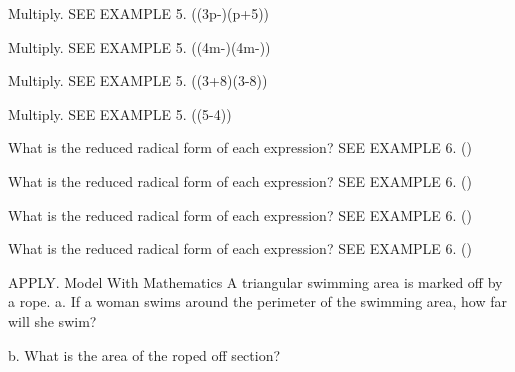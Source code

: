 \documentclass{article}
\newenvironment{practice}[2]{}{}        %
\newcommand{\answer}[1]{}               %
\newcommand{\placeholder}[2]{}          %
\begin{document}
\begin{practice}{41}{2}
Multiply. SEE EXAMPLE 5.
((3\sqrt p-)(\sqrt p+5))
\answer{(3p+14\sqrt{5p}-25)}
\end{practice}
\begin{practice}{42}{2}
Multiply. SEE EXAMPLE 5.
((4m-)(4m-))
\answer{(16m^2-8m\sqrt3+3)}
\end{practice}
\begin{practice}{43}{2}
Multiply. SEE EXAMPLE 5.
((3+8)(3-8))
\answer{(-46)}
\end{practice}
\begin{practice}{44}{2}
Multiply. SEE EXAMPLE 5.
((5-4))
\answer{(15-4\sqrt[3]{3})}
\end{practice}
\begin{practice}{45}{1}
What is the reduced radical form of each expression? SEE EXAMPLE 6.
()
\answer{(-2-2\sqrt3)}
\end{practice}
\begin{practice}{46}{1}
What is the reduced radical form of each expression? SEE EXAMPLE 6.
()
\answer{(\frac{60-20\sqrt2}7)}
\end{practice}
\begin{practice}{47}{1}
What is the reduced radical form of each expression? SEE EXAMPLE 6.
()
\answer{(\frac{-11-8\sqrt2}{14})}
\end{practice}
\begin{practice}{48}{1}
What is the reduced radical form of each expression? SEE EXAMPLE 6.
()
\answer{(\frac{-6x+2x\sqrt x}{9-x})}
\end{practice}
\begin{practice}{49}{1}
APPLY. Model With Mathematics A triangular swimming area is marked off by a rope.
a. If a woman swims around the perimeter of the swimming area, how far will she swim?
\answer{a. (600+200\sqrt3+200\sqrt6) m}
b. What is the area of the roped off section?
\answer{b. (20,000\sqrt3+60,000\text{ m}^2)}
\placeholder{illustration}{Triangular area in blue water bounded by a rope with red and white floats. Left sloping side is labeled 400 m. A white vertical altitude joins the upper vertex to the horizontal lower side, splitting it into lengths 200 m on the left and (200\sqrt3) m on the right. A swimmer is beside the altitude's foot and a boat is at upper right.}
\end{practice}
\end{document}
